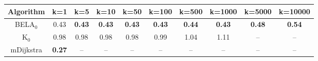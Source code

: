 \begin{tabular}{c|ccccccccc}\toprule
Algorithm & k=1 & k=5 & k=10 & k=50 & k=100 & k=500 & k=1000 & k=5000 & k=10000 \\ \midrule
BELA$_0$ & 0.43 & \textbf{0.43} & \textbf{0.43} & \textbf{0.43} & \textbf{0.43} & \textbf{0.44} & \textbf{0.43} & \textbf{0.48} & \textbf{0.54} \\
K$_0$ & 0.98 & 0.98 & 0.98 & 0.98 & 0.99 & 1.04 & 1.11 & -- & -- \\
mDijkstra & \textbf{0.27} & -- & -- & -- & -- & -- & -- & -- & -- \\ \bottomrule 
\end{tabular}
